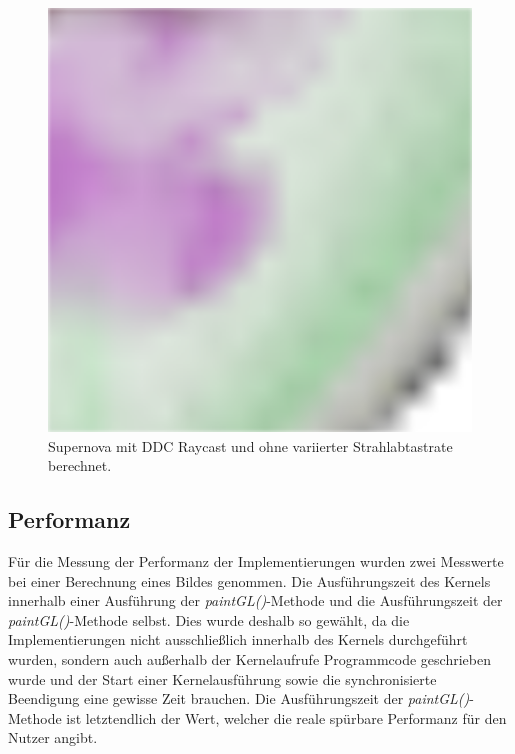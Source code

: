 \begin{figure}[]
\begin{minipage}[t]{0.3\textwidth}
	\end{minipage}
	\hfill
	\begin{minipage}[t]{0.3\textwidth}
		\centering
		\includegraphics[width=1\textwidth]{../../Neue_Messungen/Supernova/cut/ddc_ors/ddc_ors_3.png}
	\end{minipage}
	\caption{Supernova mit DDC Raycast und ohne variierter Strahlabtastrate berechnet.}
	\label{fig::res::sn_comp_ddc_ors}
\end{figure}


\subsection{Performanz}
Für die Messung der Performanz der Implementierungen wurden zwei Messwerte bei einer Berechnung eines Bildes genommen.
Die Ausführungszeit des Kernels innerhalb einer Ausführung der \emph{paintGL()}-Methode und die Ausführungszeit der \emph{paintGL()}-Methode selbst.
Dies wurde deshalb so gewählt, da die Implementierungen nicht ausschließlich innerhalb des Kernels durchgeführt wurden, sondern auch außerhalb der Kernelaufrufe Programmcode geschrieben wurde und der Start einer Kernelausführung sowie die synchronisierte Beendigung eine gewisse Zeit brauchen.
Die Ausführungszeit der \emph{paintGL()}-Methode ist letztendlich der Wert, welcher die reale spürbare Performanz für den Nutzer angibt.

